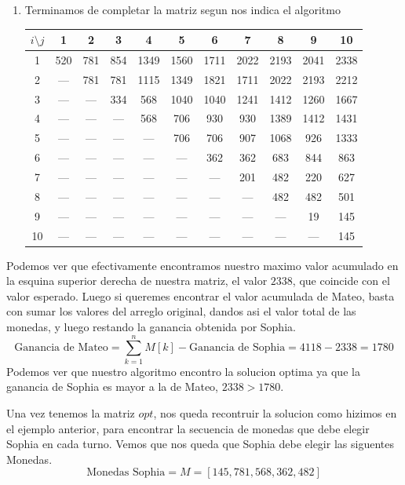 \begin{enumerate}
    \item Terminamos de completar la matriz segun nos indica el algoritmo
    \begin{table}[H]
    \centering
    \begin{tabular}{ccccccccccc}
    \toprule
    $i \setminus j$ & 1 & 2 & 3 & 4 & 5 & 6 & 7 & 8 & 9 & 10 \\
    \midrule
   1  & 520 & 781 &  854 & 1349 & 1560 & 1711 & 2022 & 2193 & 2041 & 2338 \\
   2  & --- & 781 &  781 & 1115 & 1349 & 1821 & 1711 & 2022 & 2193 & 2212 \\
   3  & --- & --- &  334 &  568 & 1040 & 1040 & 1241 & 1412 & 1260 & 1667 \\
   4  & --- & --- &  --- &  568 &  706 &  930 &  930 & 1389 & 1412 & 1431 \\
   5  & --- & --- &  --- &  --- &  706 &  706 &  907 & 1068 &  926 & 1333 \\
   6  & --- & --- &  --- &  --- &  --- &  362 &  362 &  683 &  844 &  863 \\
   7  & --- & --- &  --- &  --- &  --- &  --- &  201 &  482 &  220 &  627 \\
   8  & --- & --- &  --- &  --- &  --- &  --- &  --- &  482 &  482 &  501 \\
   9  & --- & --- &  --- &  --- &  --- &  --- &  --- &  --- &   19 &  145 \\
   10 & --- & --- &  --- &  --- &  --- &  --- &  --- &  --- &  --- &  145 \\
    \bottomrule
    \end{tabular}
    \end{table}
\end{enumerate}

Podemos ver que efectivamente encontramos nuestro maximo valor acumulado en la esquina superior derecha de nuestra matriz, el valor $2338$, que coincide con el valor esperado. Luego si queremes encontrar el valor acumulada de Mateo, basta con sumar los valores del arreglo original, dandos asi el valor total de las monedas, y luego restando la ganancia obtenida por Sophia.
\[
\text{Ganancia de Mateo} = \sum_{k=1}^{n} M[k] - \text{Ganancia de Sophia} = 4118 - 2338 = 1780
\]
Podemos ver que nuestro algoritmo encontro la solucion optima ya que la ganancia de Sophia es mayor a la de Mateo, $2338 > 1780$.

Una vez tenemos la matriz $opt$, nos queda recontruir la solucion como hizimos en el ejemplo anterior, para encontrar la secuencia de monedas que debe elegir Sophia en cada turno. Vemos que nos queda que Sophia debe elegir las siguentes Monedas.
\[
\text{Monedas Sophia} = M = [145, 781, 568, 362, 482]
\]

